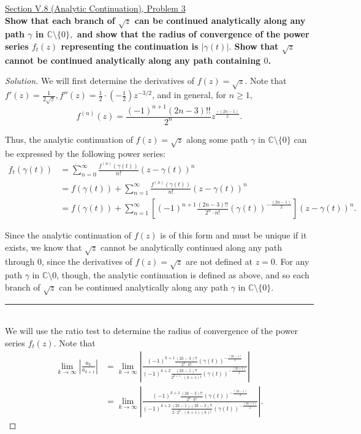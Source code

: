 \documentclass[11pt]{article}
\newcommand{\Sum}{\sum\limits_{n=0}^{\infty}}
\newenvironment{solution}
  {\renewcommand\qedsymbol{$\blacksquare$}\begin{proof}[Solution]}
  {\end{proof}}
\theoremstyle{definition}
\begin{document}
\newpage

\underline{Section V.8 (Analytic Continuation), Problem 3} \\

\textbf{Show that each branch of $\sqrt{z}$ can be continued analytically along any path $\gamma$ in $\mathbb{C} \setminus \{0\},$ and show that the radius of convergence
of the power series $f_t(z)$ representing the continuation is $|\gamma(t)|.$ Show that $\sqrt{z}$ cannot be continued analytically along any path containing $0$.}

\begin{solution}
We will first determine the derivatives of $f(z) = \sqrt{z}$. Note that $f'(z) = \frac{1}{2\sqrt{z}}, f''(z) = \frac{1}{2} \cdot \left(-\frac{1}{2}\right)z^{-3/2}$, and in general, for $n \geq 1$,
\[f^{(n)}(z) = \frac{(-1)^{n+1} (2n-3)!!}{2^n} z^{\frac{-(2n-1)}{2}}.\]

Thus, the analytic continuation of $f(z) = \sqrt{z}$ along some path $\gamma$ in $\mathbb{C} \setminus \{0\}$ can be expressed by the following power series:
\begin{align*} f_t(\gamma(t)) &= \Sum \frac{f^{(n)}(\gamma(t))}{n!} (z-\gamma(t))^n  \\
&= f(\gamma(t)) + \sum\limits_{n=1}^{\infty} \frac{f^{(n)}(\gamma(t))}{n!} (z-\gamma(t))^n \\
&= f(\gamma(t)) + \sum\limits_{n=1}^{\infty} \left[(-1)^{n+1} \frac{(2n-3)!!}{2^n \cdot n!} (\gamma(t))^{-\frac{(2n-1)}{2}}\right] (z-\gamma(t))^n.\end{align*}

Since the analytic continuation of $f(z)$ is of this form and must be unique if it exists, we know that $\sqrt{z}$ cannot be analytically continued along any path through $0$, since the derivatives of $f(z) = \sqrt{z}$ are not defined at $z=0$. 
For any path $\gamma$ in $\mathbb{C} \setminus 0$, though, the analytic continuation is defined as above, and so each branch of $\sqrt{z}$ can be continued analytically along any path $\gamma$ in $\mathbb{C} \setminus \{0\}.$\\

\noindent\rule{\textwidth}{1pt} \\

We will use the ratio test to determine the radius of convergence of the power series $f_t(z)$. Note that
\begin{align*} \lim\limits_{k \rightarrow \infty} \left| \frac{a_k}{a_{k+1}}\right| &=  \lim\limits_{k \rightarrow \infty} \left| \frac{ (-1)^{k+1} \frac{(2k-3)!!}{2^k \cdot k!} (\gamma(t))^{-\frac{(2k-1)}{2}}}{(-1)^{k+2} \frac{(2k-1)!!}{2^{k+1} \cdot (k+1)!} (\gamma(t))^{-\frac{(2k+1)}{2}}}\right| \\
&= \lim\limits_{k \rightarrow \infty} \left| \frac{ (-1)^{k+1} \frac{(2k-3)!!}{2^k \cdot k!} (\gamma(t))^{-\frac{(2k-1)}{2}}}{(-1)^{k+2} \frac{(2k-1)(2k-3)!!}{2 \cdot 2^{k} \cdot (k+1)(k)!} (\gamma(t))^{-\frac{(2k+1)}{2}}}\right|.\end{align*}


\end{solution}
\end{document}
